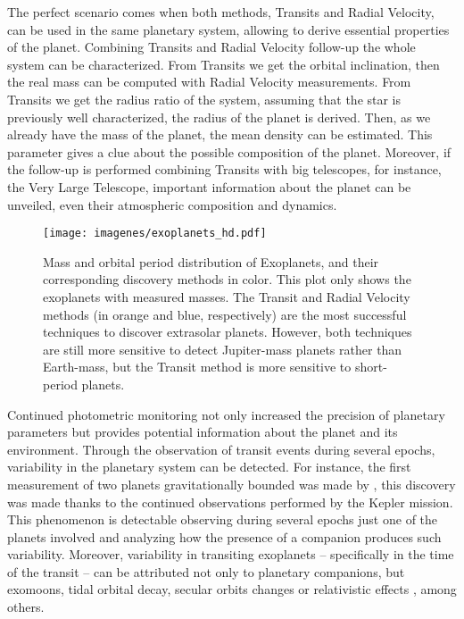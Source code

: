 The perfect scenario comes when both methods, Transits and Radial Velocity, can be used in the same planetary system, allowing to derive essential properties of the planet. Combining Transits and Radial Velocity follow-up the whole system can be characterized. From Transits we get the orbital inclination, then the real mass can be computed with Radial Velocity measurements. From Transits we get the radius ratio of the system, assuming that the star is previously well characterized, the radius of the planet is derived. Then, as we already have the mass of the planet, the mean density can be estimated. This parameter gives a clue about the possible composition of the planet. Moreover, if the follow-up is performed combining Transits with big telescopes, for instance, the Very Large Telescope, important information about the planet can be unveiled, even their atmospheric composition and dynamics.

\begin{figure}[t]
\centering
\texttt{[image: imagenes/exoplanets\_hd.pdf]}
\caption{Mass and orbital period distribution of Exoplanets, and their corresponding discovery methods in color. This plot only shows the exoplanets with measured masses. The Transit and Radial Velocity methods (in orange and blue, respectively) are the most successful techniques to discover extrasolar planets. However, both techniques are still more sensitive to detect Jupiter-mass planets rather than Earth-mass, but the Transit method is more sensitive to short-period planets.}
\label{exoplanets}
\end{figure}



Continued photometric monitoring not only increased the precision of planetary parameters but provides potential information about the planet and its environment. Through the observation of transit events during several epochs, variability in the planetary system can be detected. For instance, the first measurement of two planets gravitationally bounded was made by \citep{Holman2010}, this discovery was made thanks to the continued observations performed by the Kepler mission. This phenomenon is detectable observing during several epochs just one of the planets involved and analyzing how the presence of a companion produces such variability. Moreover, variability in transiting exoplanets -- specifically in the time of the transit -- can be attributed not only to planetary companions, but exomoons\citep{Kipping2009a,Kipping2009b}, tidal orbital decay\citep{Hoyer2016,Hoyer2016b}, secular orbits changes\citep{Adams2006} or relativistic effects \citep{Heyl2007}, among others.

